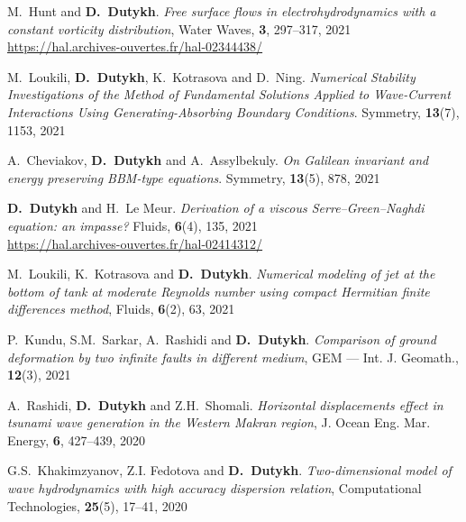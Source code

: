 \documentclass[final, a4paper, oneside, 12pt]{article}
\numberwithin{equation}{section}
\begin{document}
\begin{etaremune}
  \item M.~Hunt and \textbf{D.~Dutykh}. \textit{Free surface flows in electrohydrodynamics with a constant vorticity distribution}, Water Waves, \textbf{3}, 297--317, 2021 \\ %
  \url{https://hal.archives-ouvertes.fr/hal-02344438/}
  
  \item M.~Loukili, \textbf{D.~Dutykh}, K.~Kotrasova and D.~Ning. \textit{Numerical Stability Investigations of the Method of Fundamental Solutions Applied to Wave-Current Interactions Using Generating-Absorbing Boundary Conditions}. Symmetry, \textbf{13}(7), 1153, 2021 %
  
  \item A.~Cheviakov, \textbf{D.~Dutykh} and A.~Assylbekuly. \textit{On Galilean invariant and energy preserving BBM-type equations}. Symmetry, \textbf{13}(5), 878, 2021 %
  
  \item \textbf{D.~Dutykh} and H.~Le Meur. \textit{Derivation of a viscous Serre--Green--Naghdi equation: an impasse?} Fluids, \textbf{6}(4), 135, 2021 \\ %
  \url{https://hal.archives-ouvertes.fr/hal-02414312/}
  
  \item M.~Loukili, K.~Kotrasova and \textbf{D.~Dutykh}. \textit{Numerical modeling of jet at the bottom of tank at moderate Reynolds number using compact Hermitian finite differences method}, Fluids, \textbf{6}(2), 63, 2021 %
  
  \item P.~Kundu, S.M.~Sarkar, A.~Rashidi and \textbf{D.~Dutykh}. \textit{Comparison of ground deformation by two infinite faults in different medium}, GEM --- Int. J. Geomath., \textbf{12}(3), 2021 %
  
  
  \item A.~Rashidi, \textbf{D.~Dutykh} and Z.H.~Shomali. \textit{Horizontal displacements effect in tsunami wave generation in the Western Makran region}, J. Ocean Eng. Mar. Energy, \textbf{6}, 427--439, 2020 %
  
  \item G.S.~Khakimzyanov, Z.I. Fedotova and \textbf{D.~Dutykh}. \textit{Two-dimensional model of wave hydrodynamics with high accuracy dispersion relation}, Computational Technologies, \textbf{25}(5), 17--41, 2020 %
  

\end{etaremune}
\end{document}
